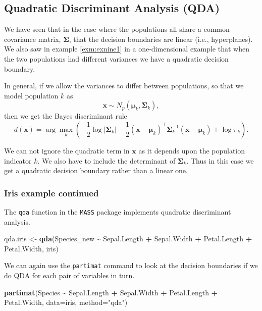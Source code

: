 \documentclass[
]{book}
\newenvironment{Shaded}{\begin{snugshade}}{\end{snugshade}}
\newcommand{\AttributeTok}[1]{\textcolor[rgb]{0.13,0.29,0.53}{#1}}
\newcommand{\FunctionTok}[1]{\textcolor[rgb]{0.13,0.29,0.53}{\textbf{#1}}}
\newcommand{\NormalTok}[1]{#1}
\newcommand{\OtherTok}[1]{\textcolor[rgb]{0.56,0.35,0.01}{#1}}
\newcommand{\SpecialCharTok}[1]{\textcolor[rgb]{0.81,0.36,0.00}{\textbf{#1}}}
\newcommand{\StringTok}[1]{\textcolor[rgb]{0.31,0.60,0.02}{#1}}
\theoremstyle{definition}
\theoremstyle{definition}
\theoremstyle{definition}
\theoremstyle{definition}
\theoremstyle{remark}
\begin{document}
\subsection{Quadratic Discriminant Analysis (QDA)}\label{quadratic-discriminant-analysis-qda}

We have seen that in the case where the populations all share a common covariance matrix, \(\boldsymbol{\Sigma}\), that the decision boundaries are linear (i.e., hyperplanes). We also saw in example \ref{exm:exnine1} in a one-dimensional example that when the two populations had different variances we have a quadratic decision boundary.

In general, if we allow the variances to differ between populations, so that we model population \(k\) as \[\mathbf x\sim N_p({\boldsymbol{\mu}}_k, \boldsymbol{\Sigma}_k),\]
then we get the Bayes discriminant rule
\[
d(\mathbf x)=\arg\max_k \left(-\frac{1}{2} \log |\boldsymbol{\Sigma}_k| - \frac{1}{2}(\mathbf x-{\boldsymbol{\mu}}_k)^\top \boldsymbol{\Sigma}_k^{-1} (\mathbf x-{\boldsymbol{\mu}}_k)+\log \pi_k\right). \]

We can not ignore the quadratic term in \(\mathbf x\) as it depends upon the population indicator \(k\). We also have to include the determinant of \(\boldsymbol{\Sigma}_k\). Thus in this case we get a quadratic decision boundary rather than a linear one.

\subsubsection{Iris example continued}\label{iris-example-continued}

The \texttt{qda} function in the \texttt{MASS} package implements quadratic discriminant analysis.

\begin{Shaded}
\begin{Highlighting}[]
\NormalTok{qda.iris }\OtherTok{\textless{}{-}} \FunctionTok{qda}\NormalTok{(Species\_new }\SpecialCharTok{\textasciitilde{}}\NormalTok{ Sepal.Length }\SpecialCharTok{+}\NormalTok{ Sepal.Width }\SpecialCharTok{+}\NormalTok{ Petal.Length }
                \SpecialCharTok{+}\NormalTok{ Petal.Width, iris)}
\end{Highlighting}
\end{Shaded}

We can again use the \texttt{partimat} command to look at the decision boundaries if we do QDA for each pair of variables in turn.

\begin{Shaded}
\begin{Highlighting}[]
\FunctionTok{partimat}\NormalTok{(Species }\SpecialCharTok{\textasciitilde{}}\NormalTok{ Sepal.Length }\SpecialCharTok{+}\NormalTok{ Sepal.Width }\SpecialCharTok{+}\NormalTok{ Petal.Length }\SpecialCharTok{+} 
\NormalTok{           Petal.Width,         }\AttributeTok{data=}\NormalTok{iris, }\AttributeTok{method=}\StringTok{"qda"}\NormalTok{)}
\end{Highlighting}
\end{Shaded}
\end{document}
